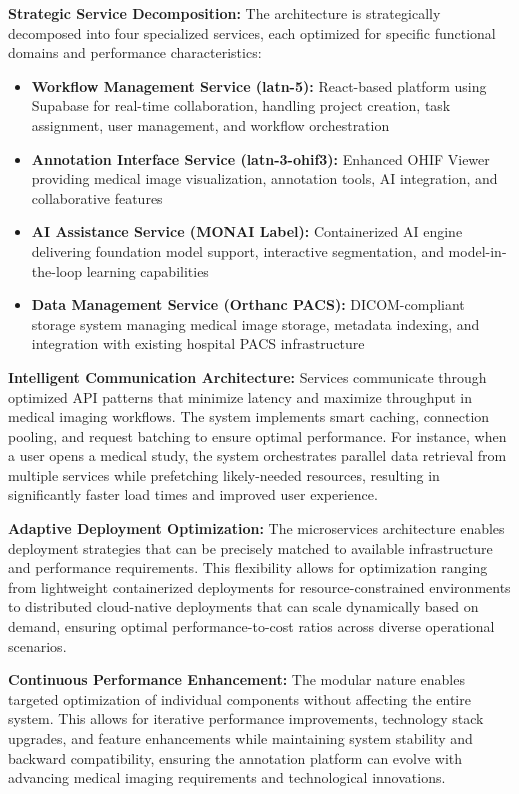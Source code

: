\textbf{Strategic Service Decomposition:} The architecture is strategically decomposed into four specialized services, each optimized for specific functional domains and performance characteristics:

\begin{itemize}
    \item \textbf{Workflow Management Service (latn-5):} React-based platform using Supabase for real-time collaboration, handling project creation, task assignment, user management, and workflow orchestration
    \item \textbf{Annotation Interface Service (latn-3-ohif3):} Enhanced OHIF Viewer providing medical image visualization, annotation tools, AI integration, and collaborative features
    \item \textbf{AI Assistance Service (MONAI Label):} Containerized AI engine delivering foundation model support, interactive segmentation, and model-in-the-loop learning capabilities
    \item \textbf{Data Management Service (Orthanc PACS):} DICOM-compliant storage system managing medical image storage, metadata indexing, and integration with existing hospital PACS infrastructure
\end{itemize}

\textbf{Intelligent Communication Architecture:} Services communicate through optimized API patterns that minimize latency and maximize throughput in medical imaging workflows. The system implements smart caching, connection pooling, and request batching to ensure optimal performance. For instance, when a user opens a medical study, the system orchestrates parallel data retrieval from multiple services while prefetching likely-needed resources, resulting in significantly faster load times and improved user experience.

\textbf{Adaptive Deployment Optimization:} The microservices architecture enables deployment strategies that can be precisely matched to available infrastructure and performance requirements. This flexibility allows for optimization ranging from lightweight containerized deployments for resource-constrained environments to distributed cloud-native deployments that can scale dynamically based on demand, ensuring optimal performance-to-cost ratios across diverse operational scenarios.

\textbf{Continuous Performance Enhancement:} The modular nature enables targeted optimization of individual components without affecting the entire system. This allows for iterative performance improvements, technology stack upgrades, and feature enhancements while maintaining system stability and backward compatibility, ensuring the annotation platform can evolve with advancing medical imaging requirements and technological innovations.


